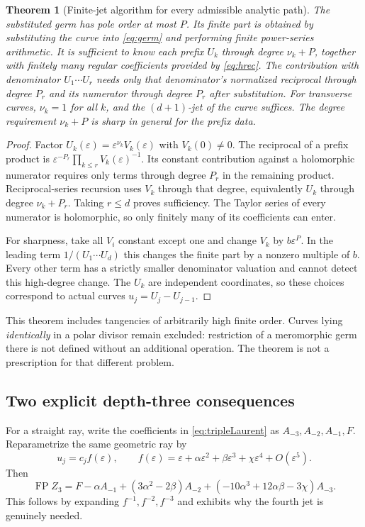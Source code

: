\documentclass[11pt,a4paper]{article}
\numberwithin{equation}{section}
\newtheorem{theorem}{Theorem}[section]
\theoremstyle{definition}\newtheorem{definition}[theorem]{Definition}
\theoremstyle{remark}\newtheorem{remark}[theorem]{Remark}
\DeclareMathOperator{\FP}{FP}
\newcommand{\eps}{\varepsilon}
\begin{document}
\begin{theorem}[Finite-jet algorithm for every admissible analytic path]
\label{thm:curve}
The substituted germ has pole order at most $P$. Its finite part is
obtained by substituting the curve into \eqref{eq:germ} and performing
finite power-series arithmetic. It is sufficient to know each prefix
$U_k$ through degree $\nu_k+P$, together with finitely many regular
coefficients provided by \eqref{eq:hrec}. The contribution with denominator
$U_1\cdots U_r$ needs only that denominator's normalized reciprocal through
degree $P_r$ and its numerator through degree $P_r$ after substitution.
For transverse curves, $\nu_k=1$ for all $k$, and the $(d+1)$-jet of the
curve suffices. The degree requirement $\nu_k+P$ is sharp in general for
the prefix data.
\end{theorem}
\begin{proof}
Factor $U_k(\eps)=\eps^{\nu_k}V_k(\eps)$ with $V_k(0)\ne0$.
The reciprocal of a prefix product is
$\eps^{-P_r}\prod_{k\le r}V_k(\eps)^{-1}$. Its constant contribution
against a holomorphic numerator requires only terms through degree $P_r$
in the remaining product. Reciprocal-series recursion uses $V_k$ through
that degree, equivalently $U_k$ through degree $\nu_k+P_r$. Taking
$r\le d$ proves sufficiency. The Taylor series of every numerator is
holomorphic, so only finitely many of its coefficients can enter.

For sharpness, take all $V_i$ constant except one and change
$V_k$ by $b\eps^P$. In the leading term $1/(U_1\cdots U_d)$ this changes
the finite part by a nonzero multiple of $b$. Every other term has a
strictly smaller denominator valuation and cannot detect this high-degree
change. The $U_k$ are independent coordinates, so these choices correspond
to actual curves $u_j=U_j-U_{j-1}$.
\end{proof}

This theorem includes tangencies of arbitrarily high finite order.
Curves lying \emph{identically} in a polar divisor remain excluded:
restriction of a meromorphic germ there is not defined without an
additional operation. The theorem is not a prescription for that different
problem.

\subsection{Two explicit depth-three consequences}
For a straight ray, write the coefficients in \eqref{eq:tripleLaurent} as
$A_{-3},A_{-2},A_{-1},F$. Reparametrize the same geometric ray by
\[
 u_j=c_j f(\eps),\qquad
 f(\eps)=\eps+\alpha\eps^2+\beta\eps^3+\chi\eps^4+O(\eps^5).
\]
Then
\begin{equation}\label{eq:reparam}
 \FP Z_3=F-\alpha A_{-1}+(3\alpha^2-2\beta)A_{-2}
              +(-10\alpha^3+12\alpha\beta-3\chi)A_{-3}.
\end{equation}
This follows by expanding $f^{-1},f^{-2},f^{-3}$ and exhibits why the
fourth jet is genuinely needed.
\end{document}
